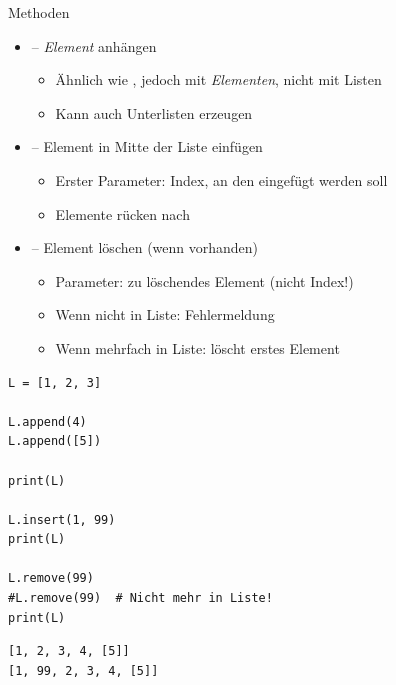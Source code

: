 
\begin{frame}[fragile]
%
\begin{minipage}{.49\linewidth}
\begin{Large}
Methoden
\vspace{6pt}
\end{Large}
\begin{itemize}
\item {} -- \emph{Element} anhängen
	\begin{itemize}
	\item Ähnlich wie \inPy{+=}, jedoch mit \emph{Elementen}, nicht mit Listen
	\item Kann auch Unterlisten erzeugen
	\end{itemize}
\item {} -- Element in Mitte der Liste einfügen
	\begin{itemize}
	\item Erster Parameter: Index, an den eingefügt werden soll
	\item Elemente rücken nach
	\end{itemize}
\item {} -- Element löschen (wenn vorhanden)
	\begin{itemize}
	\item Parameter: zu löschendes Element (nicht Index!)
	\item Wenn nicht in Liste: Fehlermeldung
	\item Wenn mehrfach in Liste: löscht erstes Element
	\end{itemize}
\end{itemize}
\end{minipage}
%
\begin{minipage}{.49\linewidth}
\phantom{x}
\begin{codebox}
\begin{verbatim}
L = [1, 2, 3]

L.append(4)
L.append([5])

print(L)

L.insert(1, 99)
print(L)

L.remove(99)
#L.remove(99)  # Nicht mehr in Liste!
print(L)
\end{verbatim}
\end{codebox}
%
\begin{cmdbox}[Ausgabe]
\begin{verbatim}
[1, 2, 3, 4, [5]]
[1, 99, 2, 3, 4, [5]]
\end{verbatim}
\end{cmdbox}
\end{minipage}
%
\end{frame}

